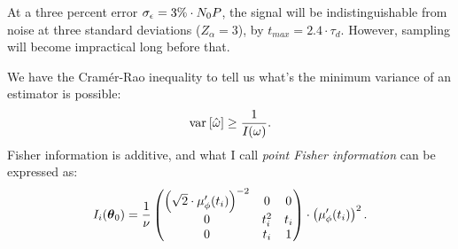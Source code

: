 \documentclass{article}
\newcommand{\obs}{\epsilon}
\begin{document}
At a three percent error $\SD{\obs} = 3\%\cdot N_0P$, the signal will be indistinguishable from noise at three standard deviations ($Z_\alpha = 3$), by $t_{max} = 2.4\cdot \tau_d$. However, sampling will become impractical long before that.

We have the Cram\'er-Rao inequality to tell us what's the minimum variance of an estimator is possible:
\[
	\var{\hat{\omega}} \geq \frac{1}{\Fisher(\omega)}.
\]
Fisher information is additive, and what I call \emph{point Fisher information} can be expressed as:
\[
	\Fisher[i] = \frac{1}{\nu}\begin{pmatrix}
		\bkt{\sqrt{2}\cdot\mupp}^{-2} & 0     & 0   \\
		0                             & t_i^2 & t_i \\
		0                             & t_i   & 1
	\end{pmatrix}\cdot \bkt{\mupp}^2.
\]

\begin{wrapfigure}{l}{.25\textwidth}
\end{wrapfigure}
\end{document}
